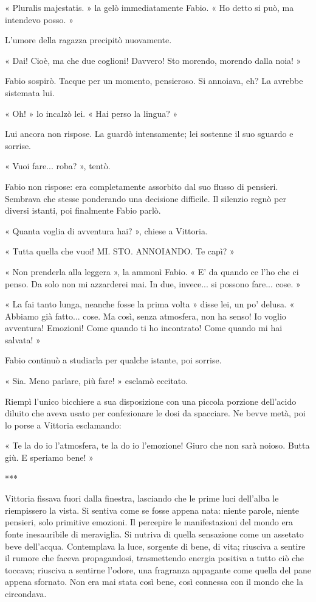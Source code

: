 « Pluralis majestatis. » la gelò immediatamente Fabio. « Ho detto si può, ma intendevo posso. »

L'umore della ragazza precipitò nuovamente.

« Dai! Cioè, ma che due coglioni! Davvero! Sto morendo, morendo dalla noia! »

Fabio sospirò. Tacque per un momento, pensieroso. Si annoiava, eh? La avrebbe sistemata lui.

« Oh! » lo incalzò lei. « Hai perso la lingua? »

Lui ancora non rispose. La guardò intensamente; lei sostenne il suo sguardo e sorrise.

« Vuoi fare... roba? », tentò.

Fabio non rispose: era completamente assorbito dal suo flusso di pensieri. Sembrava che stesse ponderando una decisione difficile. Il silenzio regnò per diversi istanti, poi finalmente Fabio parlò.

« Quanta voglia di avventura hai? », chiese a Vittoria.

« Tutta quella che vuoi! MI. STO. ANNOIANDO. Te capì? »

« Non prenderla alla leggera », la ammonì Fabio. « E' da quando ce l'ho che ci penso. Da solo non mi azzarderei mai. In due, invece... si possono fare... cose. »

« La fai tanto lunga, neanche fosse la prima volta » disse lei, un po' delusa. « Abbiamo già fatto... cose. Ma così, senza atmosfera, non ha senso! Io voglio avventura! Emozioni! Come quando ti ho incontrato! Come quando mi hai salvata! »

Fabio continuò a studiarla per qualche istante, poi sorrise.

« Sia. Meno parlare, più fare! » esclamò eccitato.

Riempì l'unico bicchiere a sua disposizione con una piccola porzione dell'acido diluito che aveva usato per confezionare le dosi da spacciare. Ne bevve metà, poi lo porse a Vittoria esclamando:

« Te la do io l'atmosfera, te la do io l'emozione! Giuro che non sarà noioso. Butta giù. E speriamo bene! »

***

Vittoria fissava fuori dalla finestra, lasciando che le prime luci dell'alba le riempissero la vista. Si sentiva come se fosse appena nata: niente parole, niente pensieri, solo primitive emozioni. Il percepire le manifestazioni del mondo era fonte inesauribile di meraviglia. Si nutriva di quella sensazione come un assetato beve dell'acqua. Contemplava la luce, sorgente di bene, di vita; riusciva a sentire il rumore che faceva propagandosi, trasmettendo energia positiva a tutto ciò che toccava; riusciva a sentirne l'odore, una fragranza appagante come quella del pane appena sfornato. Non era mai stata così bene, così connessa con il mondo che la circondava.

